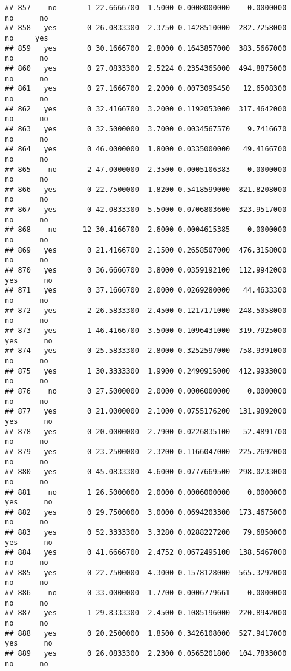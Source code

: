 \documentclass[]{article}
\begin{document}
\begin{verbatim}
## 857    no       1 22.6666700  1.5000 0.0008000000    0.0000000    no      no
## 858   yes       0 26.0833300  2.3750 0.1428510000  282.7258000    no     yes
## 859   yes       0 30.1666700  2.8000 0.1643857000  383.5667000    no      no
## 860   yes       0 27.0833300  2.5224 0.2354365000  494.8875000    no      no
## 861   yes       0 27.1666700  2.2000 0.0073095450   12.6508300    no      no
## 862   yes       0 32.4166700  3.2000 0.1192053000  317.4642000    no      no
## 863   yes       0 32.5000000  3.7000 0.0034567570    9.7416670    no      no
## 864   yes       0 46.0000000  1.8000 0.0335000000   49.4166700    no      no
## 865    no       2 47.0000000  2.3500 0.0005106383    0.0000000    no      no
## 866   yes       0 22.7500000  1.8200 0.5418599000  821.8208000    no      no
## 867   yes       0 42.0833300  5.5000 0.0706803600  323.9517000    no      no
## 868    no      12 30.4166700  2.6000 0.0004615385    0.0000000    no      no
## 869   yes       0 21.4166700  2.1500 0.2658507000  476.3158000    no      no
## 870   yes       0 36.6666700  3.8000 0.0359192100  112.9942000   yes      no
## 871   yes       0 37.1666700  2.0000 0.0269280000   44.4633300    no      no
## 872   yes       2 26.5833300  2.4500 0.1217171000  248.5058000    no      no
## 873   yes       1 46.4166700  3.5000 0.1096431000  319.7925000   yes      no
## 874   yes       0 25.5833300  2.8000 0.3252597000  758.9391000    no      no
## 875   yes       1 30.3333300  1.9900 0.2490915000  412.9933000    no      no
## 876    no       0 27.5000000  2.0000 0.0006000000    0.0000000    no      no
## 877   yes       0 21.0000000  2.1000 0.0755176200  131.9892000   yes      no
## 878   yes       0 20.0000000  2.7900 0.0226835100   52.4891700    no      no
## 879   yes       0 23.2500000  2.3200 0.1166047000  225.2692000    no      no
## 880   yes       0 45.0833300  4.6000 0.0777669500  298.0233000    no      no
## 881    no       1 26.5000000  2.0000 0.0006000000    0.0000000   yes      no
## 882   yes       0 29.7500000  3.0000 0.0694203300  173.4675000    no      no
## 883   yes       0 52.3333300  3.3280 0.0288227200   79.6850000   yes      no
## 884   yes       0 41.6666700  2.4752 0.0672495100  138.5467000    no      no
## 885   yes       0 22.7500000  4.3000 0.1578128000  565.3292000    no      no
## 886    no       0 33.0000000  1.7700 0.0006779661    0.0000000    no      no
## 887   yes       1 29.8333300  2.4500 0.1085196000  220.8942000    no      no
## 888   yes       0 20.2500000  1.8500 0.3426108000  527.9417000   yes      no
## 889   yes       0 26.0833300  2.2300 0.0565201800  104.7833000    no      no

\end{verbatim}
\end{document}
